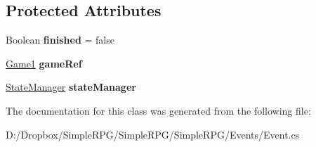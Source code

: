 \subsection*{Protected Attributes}
\begin{DoxyCompactItemize}
\item 
\hypertarget{class_simple_r_p_g_1_1_events_1_1_event_af9e2be9b16bc904e3276ed114a4d11a5}{Boolean {\bfseries finished} = false}\label{class_simple_r_p_g_1_1_events_1_1_event_af9e2be9b16bc904e3276ed114a4d11a5}

\item 
\hypertarget{class_simple_r_p_g_1_1_events_1_1_event_a60fe4373065c00d225e11f24c785197c}{\hyperlink{class_simple_r_p_g_1_1_game1}{Game1} {\bfseries game\+Ref}}\label{class_simple_r_p_g_1_1_events_1_1_event_a60fe4373065c00d225e11f24c785197c}

\item 
\hypertarget{class_simple_r_p_g_1_1_events_1_1_event_a08f23edd033e042324051522a1533c84}{\hyperlink{class_simple_r_p_g_1_1_states_1_1_state_manager}{State\+Manager} {\bfseries state\+Manager}}\label{class_simple_r_p_g_1_1_events_1_1_event_a08f23edd033e042324051522a1533c84}

\end{DoxyCompactItemize}


The documentation for this class was generated from the following file\+:\begin{DoxyCompactItemize}
\item 
D\+:/\+Dropbox/\+Simple\+R\+P\+G/\+Simple\+R\+P\+G/\+Simple\+R\+P\+G/\+Events/Event.\+cs\end{DoxyCompactItemize}
